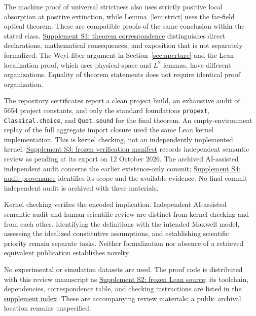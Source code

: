 \documentclass[11pt]{article}
\begin{document}
The machine proof of universal strictness also uses strictly positive local absorption at positive extinction, while Lemma~\ref{lem:strict} uses the far-field optical theorem. These are compatible proofs of the same conclusion within the stated class. \href{theorem-correspondence.html}{Supplement S1: theorem correspondence} distinguishes direct declarations, mathematical consequences, and exposition that is not separately formalized. The Weyl-fiber argument in Section~\ref{sec:aperture} and the Lean localization proof, which uses physical-space and $L^2$ lemmas, have different organizations. Equality of theorem statements does not require identical proof organization.

The repository certificates report a clean project build, an exhaustive audit of 5654 project constants, and only the standard foundations \texttt{propext}, \texttt{Classical.choice}, and \texttt{Quot.sound} for the final theorem. An empty-environment replay of the full aggregate import closure used the same Lean kernel implementation. This is kernel checking, not an independently implemented kernel. \href{reproducibility/manifest.json}{Supplement S3: frozen verification manifest} records independent semantic review as pending at its export on 12 October 2026. The archived AI-assisted independent audit concerns the earlier existence-only commit; \href{reproducibility/AUDIT_PROVENANCE.md}{Supplement S4: audit provenance} identifies its scope and the available evidence. No final-commit independent audit is archived with these materials.

Kernel checking verifies the encoded implication. Independent AI-assisted semantic audit and human scientific review are distinct from kernel checking and from each other. Identifying the definitions with the intended Maxwell model, assessing the idealized constitutive assumptions, and establishing scientific priority remain separate tasks. Neither formalization nor absence of a retrieved equivalent publication establishes novelty.

No experimental or simulation datasets are used. The proof code is distributed with this review manuscript as \href{reproducibility/OQ7-complete-physical-theorem11-source.zip}{Supplement S2: frozen Lean source}; its toolchain, dependencies, correspondence table, and checking instructions are listed in the \href{reproducibility/SUPPLEMENT_INDEX.html}{supplement index}. These are accompanying review materials; a public archival location remains unspecified.
\end{document}
